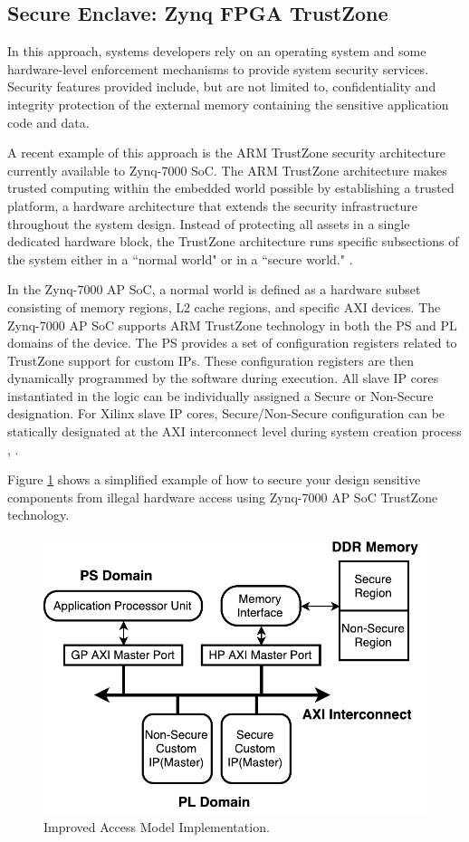\documentclass[sigconf]{acmart}
\theoremstyle{plain}
\theoremstyle{remark}
\begin{document}
\subsection{Secure Enclave: Zynq FPGA TrustZone}

In this approach, systems developers rely on an operating system and some hardware-level enforcement mechanisms to provide system security services. Security features provided include, but are not limited to, confidentiality and integrity protection of the external memory containing the sensitive application code and data.

A recent example of this approach is the ARM TrustZone security architecture currently available to Zynq-7000 SoC. The ARM TrustZone architecture makes trusted computing within the embedded world possible by establishing a trusted platform, a hardware architecture that extends the security infrastructure throughout the system design. Instead of protecting all assets in a single dedicated hardware block, the TrustZone architecture runs specific subsections of the system either in a ``normal world" or in a ``secure world." \cite{xilinxtrust}.

In the Zynq-7000 AP SoC, a normal world is defined as a hardware subset consisting of memory regions, L2 cache regions, and specific AXI devices. The Zynq-7000 AP SoC supports ARM TrustZone technology in both the PS and PL domains of the device. The PS provides a set of configuration registers related to TrustZone support for custom IPs. These configuration registers are then dynamically programmed by the software during execution. All slave IP cores instantiated in the logic can be individually assigned a Secure or Non-Secure designation. For Xilinx slave IP cores, Secure/Non-Secure configuration can be statically designated at the AXI interconnect level during system creation process \cite{xilinxprotrust}, \cite{xilinxtrust}.

Figure \ref{fig:trustzone} shows a simplified example of how to secure your design sensitive components from illegal hardware access using Zynq-7000 AP SoC TrustZone technology.

\begin{figure}[hbt]
\centering
\includegraphics[width=0.75\columnwidth]{figures/TrustZoneHardware.pdf}
\caption{Improved Access Model Implementation.} %
\label{fig:trustzone}
\end{figure}
\end{document}

